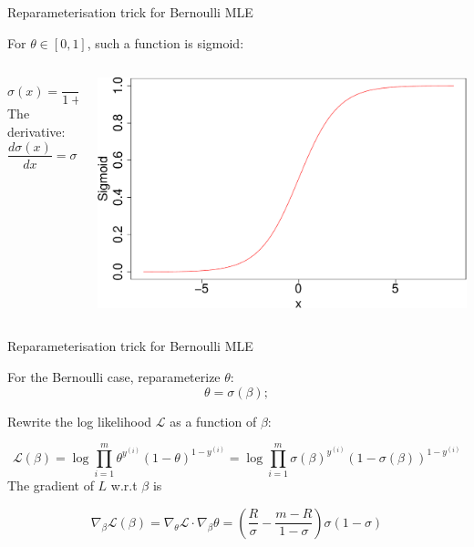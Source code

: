 \documentclass[ignorenonframetext,]{beamer}
\newcommand{\di}[2]{\ensuremath{ #1^{(#2)}}}
\begin{document}
\begin{frame}{Reparameterisation trick for Bernoulli MLE}
\protect\hypertarget{reparameterisation-trick-for-bernoulli-mle}{}

For \(\theta \in [0,1]\), such a function is sigmoid:

\begin{columns}
\begin{column}{0.4\textwidth}
$$\sigma(x) = \frac{1}{1+e^{-x}} = \frac{e^x}{e^x+1};$$
The derivative: 
$$\frac{d\sigma(x)}{dx} = \sigma(x)(1-\sigma(x))$$
\end{column}

\begin{column}{0.6\textwidth}

\begin{center}\includegraphics[width=1\linewidth]{lecture4_files/figure-beamer/unnamed-chunk-7-1} \end{center}
\end{column}
\end{columns}

\end{frame}

\begin{frame}{Reparameterisation trick for Bernoulli MLE}
\protect\hypertarget{reparameterisation-trick-for-bernoulli-mle-1}{}

For the Bernoulli case, reparameterize \(\theta\):
\[\theta = \sigma(\beta);\]

Rewrite the log likelihood \(\mathcal{L}\) as a function of \(\beta\):

\[\mathcal{L}(\beta) = \log \prod_{i=1}^m \theta^{\di{y}{i}}(1-\theta)^{1-\di{y}{i}}= \log \prod_{i=1}^m \sigma(\beta)^{\di{y}{i}}(1-\sigma(\beta))^{1-\di{y}{i}}\]
The gradient of \(L\) w.r.t \(\beta\) is

\[\nabla_\beta \mathcal{L}(\beta) = \nabla_{\theta} \mathcal{L} \cdot \nabla_\beta{\theta} = \left(\frac{R}{\sigma} - \frac{m-R}{1-\sigma}\right)\sigma(1-\sigma)\]

\end{frame}
\end{document}
